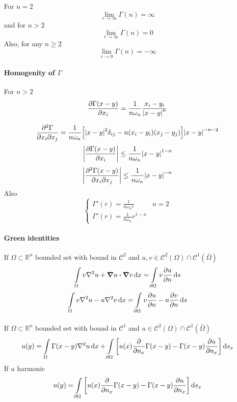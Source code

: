 For $n=2$
$$\lim_{r\to \infty}\Gamma(n) = \infty $$
and for $n>2$
$$\lim_{r\to \infty}\Gamma(n) = 0 $$
Also, for any $n\geq 2$
$$\lim_{r\to 0} \Gamma(n) = -\infty$$

\paragraph{Homogenity of $\Gamma$}
For $n>2$
$$\pdv{\Gamma(x-y)}{x_i} = \frac{1}{n\omega_n} \frac{x_i-y_i}{\abs{ x-y}^n} $$

$$\pdv{\Gamma}{x_i}{x_j} = \frac{1}{n\omega_n} \qty[\abs{x-y}^2 \delta_{ij} - n(x_i-y_i)(x_j-y_j)] \abs{x-y}^{-n-2}$$
$$\abs{\pdv{\Gamma(x-y)}{x_i}} \leq \frac{1}{n\omega_n} \abs{x-y}^{1-n}$$
$$\abs{\pdv{\Gamma(x-y)}{x_i}{x_j}} \leq \frac{1}{n\omega_n} \abs{x-y}^{-n}$$
	Also
$$\begin{cases}
\Gamma'(r) = \frac{1}{n\omega_n r}& n=2\\
\Gamma'(r) = \frac{1}{n\omega_n} r^{1-n}
\end{cases}$$
\paragraph{Green identities}
If $\Omega \subset \mathbb{R}^n$ bounded set with bound in $\mathcal{C}^2$ and
$u,v \in \mathcal{C}^2(\Omega) \cap \mathcal{C}^1(\bar{\Omega})$
$$\int\limits_{\Omega} v\laplacian{u} + \grad{u} \vdot \grad{v}  \dd{x} = \int\limits_{\partial \Omega} v \pdv{u}{n} \dd{s} $$
$$\int\limits_{\Omega} v\laplacian{u} - u \laplacian{v} \dd{x} = \int\limits_{\partial \Omega} v \pdv{u}{n} - u \pdv{v}{n} \dd{s} $$
\paragraph{}
If $\Omega \subset \mathbb{R}^n$ bounded set with bound in $\mathcal{C}^1$ and
$u \in \mathcal{C}^2(\Omega) \cap \mathcal{C}^1(\bar{\Omega})$
$$u(y) = \int\limits_{\Omega} \Gamma(x-y) \laplacian{u} \dd{x} + \int\limits_{\partial \Omega} \qty[u(x) \pdv{n_x}\Gamma(x-y) - \Gamma(x-y) \pdv{u}{n_x}] \dd{s_x} $$
If $u$ harmonic
$$u(y) =  \int\limits_{\partial \Omega} \qty[u(x) \pdv{n_x}\Gamma(x-y) - \Gamma(x-y) \pdv{u}{n_x}] \dd{s_x} $$

